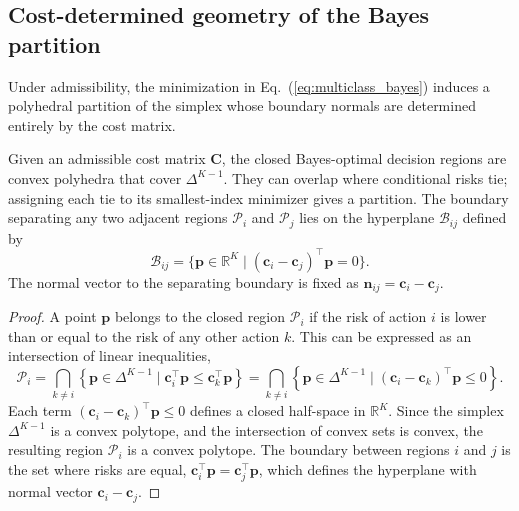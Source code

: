\subsection{Cost-determined geometry of the Bayes partition}\label{sec:cost_geometry}

Under admissibility, the minimization in Eq.~(\ref{eq:multiclass_bayes}) induces a polyhedral partition of the simplex whose boundary normals are determined entirely by the cost matrix.

\begin{theorem}\label{thm:rigid_partition}
    Given an admissible cost matrix $\mathbf{C}$, the closed Bayes-optimal decision regions are convex polyhedra that cover $\Delta^{K-1}$. They can overlap where conditional risks tie; assigning each tie to its smallest-index minimizer gives a partition. The boundary separating any two adjacent regions $\mathcal{P}_i$ and $\mathcal{P}_j$ lies on the hyperplane $\mathcal{B}_{ij}$ defined by
    \begin{equation}
        \mathcal{B}_{ij} = \{ \mathbf{p} \in \mathbb{R}^K \mid (\mathbf{c}_i - \mathbf{c}_j)^\top \mathbf{p} = 0 \}.
    \end{equation}
    The normal vector to the separating boundary is fixed as $\mathbf{n}_{ij} = \mathbf{c}_i - \mathbf{c}_j$.
\end{theorem}

\begin{proof}
    A point $\mathbf{p}$ belongs to the closed region $\mathcal{P}_i$ if the risk of action $i$ is lower than or equal to the risk of any other action $k$. This can be expressed as an intersection of linear inequalities,
    \begin{equation}\label{eq:region_def}
        \mathcal{P}_i = \bigcap_{k \neq i} \left\{ \mathbf{p} \in \Delta^{K-1} \mid \mathbf{c}_i^\top \mathbf{p} \le \mathbf{c}_k^\top \mathbf{p} \right\}
              = \bigcap_{k \neq i} \left\{ \mathbf{p} \in \Delta^{K-1} \mid (\mathbf{c}_i - \mathbf{c}_k)^\top \mathbf{p} \le 0 \right\}.
    \end{equation}
    Each term $(\mathbf{c}_i - \mathbf{c}_k)^\top \mathbf{p} \le 0$ defines a closed half-space in $\mathbb{R}^K$. Since the simplex $\Delta^{K-1}$ is a convex polytope, and the intersection of convex sets is convex, the resulting region $\mathcal{P}_i$ is a convex polytope. The boundary between regions $i$ and $j$ is the set where risks are equal, $\mathbf{c}_i^\top \mathbf{p} = \mathbf{c}_j^\top \mathbf{p}$, which defines the hyperplane with normal vector $\mathbf{c}_i - \mathbf{c}_j$.
\end{proof}

